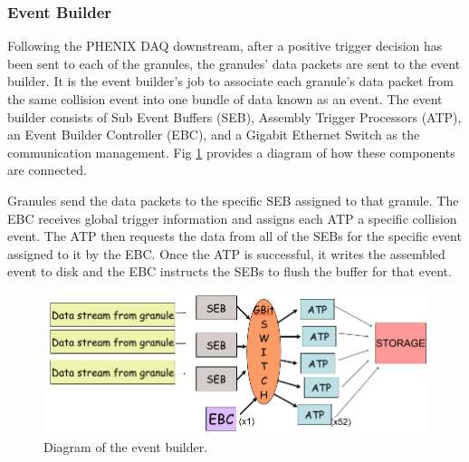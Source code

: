 
\subsubsection{Event Builder}
Following the PHENIX DAQ downstream, after a positive trigger decision has been sent to each of the granules, the granules' data packets are sent to the event builder. It is the event builder's job to associate each granule's data packet from the same collision event into one bundle of data known as an event. The event builder consists of Sub Event Buffers (SEB), Assembly Trigger Processors (ATP), an Event Builder Controller (EBC), and a Gigabit Ethernet Switch as the communication management. Fig \ref{fig:evb_diag} provides a diagram of how these components are connected.

Granules send the data packets to the specific SEB assigned to that granule. The EBC receives global trigger information and assigns each ATP a specific collision event. The ATP then requests the data from all of the SEBs for the specific event assigned to it by the EBC. Once the ATP is successful, it writes the assembled event to disk and the EBC instructs the SEBs to flush the buffer for that event.

\begin{figure}[h!]
\begin{center}
\includegraphics[width=0.73\linewidth]{figs/evb_diagram.png}
\caption{Diagram of the event builder. }\label{fig:evb_diag}
\end{center}
\end{figure}



